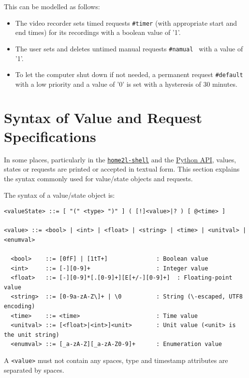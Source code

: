 \documentclass[12pt,english,parskip=half]{scrreprt}
\newcommand{\projecturl}{}
\newcommand{\idx}[1]{#1\index{#1}}
\newcommand{\toolref}[1]{\hyperref[tool:#1]{\texttt{\idx{#1}}}}
\newcommand{\docref}[2]{\href{\projecturl#1}{#2}}
\newcommand{\refapipython}{\docref{home2l-api_python/index.html}{Python API}}
\begin{document}
{\begin{enumerate}
    This can be modelled as follows:
    \begin{itemize}
    \item
      The video recorder sets timed requests \texttt{\#timer}
      (with appropriate start and end times) for its recordings with a boolean
      value of '1'.
    \item
      The user sets and deletes untimed manual requests \texttt{\#namual } with
      a value of '1'.
    \item
      To let the computer shut down if not needed, a permanent request
      \texttt{\#default} with a low priority and a value of '0' is set with a
      hysteresis of 30 minutes.
    \end{itemize}

  \end{enumerate}
}




\section{Syntax of Value and Request Specifications}
\label{sec:resources-syntax}


In some places, particularly in the \toolref{home2l-shell} and the \refapipython{},
values, states or requests are printed or accepted in textual form.
This section explains the syntax commonly used for value/state objects and requests.

The syntax of a value/state object is:

\begin{lstlisting}
<valueState> ::= [ "(" <type> ")" ] ( [!]<value>|? ) [ @<time> ]

<value> ::= <bool> | <int> | <float> | <string> | <time> | <unitval> | <enumval>

  <bool>    ::= [0fF] | [1tT+]              : Boolean value
  <int>     ::= [-][0-9]+                   : Integer value
  <float>   ::= [-][0-9]*[.[0-9]+][E[+/-][0-9]+]  : Floating-point value
  <string>  ::= [0-9a-zA-Z\]+ | \0          : String (\-escaped, UTF8 encoding)
  <time>    ::= <time>                      : Time value
  <unitval> ::= [<float>|<int>]<unit>       : Unit value (<unit> is the unit string)
  <enumval> ::= [_a-zA-Z][_a-zA-Z0-9]+      : Enumeration value
\end{lstlisting}

A \texttt{<value>} must not contain any spaces, type and timestamp
attributes are separated by spaces.
\end{document}

